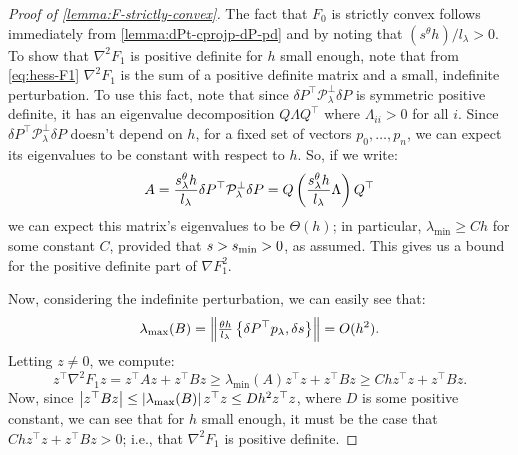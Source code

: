 \documentclass[eikonal.tex]{subfiles}
\begin{document}
\begin{proof}[Proof of \cref{lemma:F-strictly-convex}]
  The fact that $F_0$ is strictly convex follows immediately from
  \cref{lemma:dPt-cprojp-dP-pd} and by noting that
  ${(s^\theta h)}/l_\lambda > 0$. To show that $\nabla^2 F_1$ is
  positive definite for $h$ small enough, note that from
  \cref{eq:hess-F1} $\nabla^2 F_1$ is the sum of a positive definite
  matrix and a small, indefinite perturbation. To use this fact, note
  that since $\delta P^\top \mathcal{P}^\perp_\lambda \delta P$ is
  symmetric positive definite, it has an eigenvalue decomposition
  $Q \Lambda Q^\top$ where $\Lambda_{ii} > 0$ for all $i$. Since
  $\delta P^\top \mathcal{P}^\perp_\lambda \delta P$ doesn't depend on
  $h$, for a fixed set of vectors $p_0, \hdots, p_n$, we can expect
  its eigenvalues to be constant with respect to $h$. So, if we write:
  \begin{equation}
    A = \frac{s^\theta_\lambda h}{l_\lambda} \delta P^\top \mathcal{P}^\perp_\lambda \delta P = Q \left(\frac{s^\theta_\lambda h}{l_\lambda} \Lambda\right) Q^\top
  \end{equation}
  we can expect this matrix's eigenvalues to be $\Theta(h)$; in
  particular, $\lambda_{\min} \geq C h$ for some constant $C$,
  provided that $s > s_{\operatorname{min}} > 0$, as assumed. This gives us a bound for
  the positive definite part of $\nabla F_1^2$.

  Now, considering the indefinite perturbation, we can easily see
  that:
  \begin{equation}
    \lambda_{\max}(B) = \left\|\tfrac{\theta h}{l_\lambda} \left\{\delta P^\top p_\lambda,
        \delta s\right\}\right\| = O(h^2).
  \end{equation}
  Letting $z \neq 0$, we compute:
  \begin{equation}
    z^\top \nabla^2 F_1 z = z^\top A z + z^\top B z \geq \lambda_{\min}(A) z^\top z + z^\top B z \geq Ch z^\top z + z^\top B z.
  \end{equation}
  Now, since
  $\left|z^\top B z\right| \leq \left|\lambda_{\max}(B)\right| z^\top z \leq D h^2
  z^\top z$, where $D$ is some positive constant, we can see that for
  $h$ small enough, it must be the case that
  $Ch z^\top z + z^\top B z > 0$; i.e., that $\nabla^2 F_1$ is
  positive definite.
\end{proof}
\end{document}
